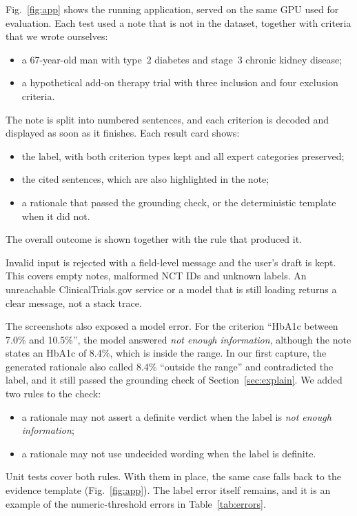 Fig.~\ref{fig:app} shows the running application, served on the same GPU used for evaluation. Each test used a
note that is not in the dataset, together with criteria that we wrote ourselves:
\begin{itemize}
\item a 67-year-old man with type~2 diabetes and stage~3 chronic kidney disease;
\item a hypothetical add-on therapy trial with three inclusion and four exclusion criteria.
\end{itemize}
The note is split into numbered sentences, and each criterion is decoded and displayed as soon as it finishes.
Each result card shows:
\begin{itemize}
\item the label, with both criterion types kept and all expert categories preserved;
\item the cited sentences, which are also highlighted in the note;
\item a rationale that passed the grounding check, or the deterministic template when it did not.
\end{itemize}
The overall outcome is shown together with the rule that produced it.

Invalid input is rejected with a field-level message and the user's draft is kept. This covers empty notes,
malformed NCT IDs and unknown labels. An unreachable ClinicalTrials.gov service or a model that is still
loading returns a clear message, not a stack trace.

The screenshots also exposed a model error. For the criterion ``HbA1c between 7.0\% and 10.5\%'', the model
answered \emph{not enough information}, although the note states an HbA1c of 8.4\%, which is inside the range.
In our first capture, the generated rationale also called 8.4\% ``outside the range'' and contradicted the
label, and it still passed the grounding check of Section~\ref{sec:explain}. We added two rules to the check:
\begin{itemize}
\item a rationale may not assert a definite verdict when the label is \emph{not enough information};
\item a rationale may not use undecided wording when the label is definite.
\end{itemize}
Unit tests cover both rules. With them in place, the same case falls back to the evidence template
(Fig.~\ref{fig:app}). The label error itself remains, and it is an example of the numeric-threshold errors
in Table~\ref{tab:errors}.

